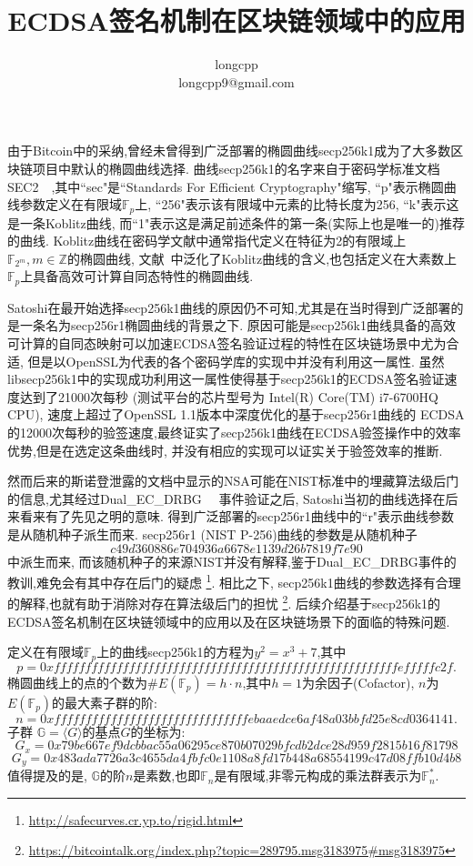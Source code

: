 \documentclass{article}
\renewcommand{\G}{\mathbb{G}}
\newcommand{\Z}{\mathbb{Z}}
\newcommand{\F}{\mathbb{F}}
\begin{document}
\title{ECDSA签名机制在区块链领域中的应用}
\author{longcpp \\ longcpp9@gmail.com}

\maketitle

由于Bitcoin中的采纳,曾经未曾得到广泛部署的椭圆曲线secp256k1成为了大多数区块链项目中默认的椭圆曲线选择.
曲线secp256k1的名字来自于密码学标准文档SEC2~\cite{}~,其中``sec"是``Standards For Efficient Cryptography"缩写,
``p"表示椭圆曲线参数定义在有限域$\F_p$上, ``256"表示该有限域中元素的比特长度为256, 
``k"表示这是一条Koblitz曲线, 而``1"表示这是满足前述条件的第一条(实际上也是唯一的)推荐的曲线.
Koblitz曲线在密码学文献中通常指代定义在特征为2的有限域上$\F_{2^m}, m\in\Z$的椭圆曲线,
文献~\cite{}中泛化了Koblitz曲线的含义,也包括定义在大素数上$\F_p$上具备高效可计算自同态特性的椭圆曲线.

Satoshi在最开始选择secp256k1曲线的原因仍不可知,尤其是在当时得到广泛部署的是一条名为secp256r1椭圆曲线的背景之下.
原因可能是secp256k1曲线具备的高效可计算的自同态映射可以加速ECDSA签名验证过程的特性在区块链场景中尤为合适,
但是以OpenSSL为代表的各个密码学库的实现中并没有利用这一属性.
虽然libsecp256k1中的实现成功利用这一属性使得基于secp256k1的ECDSA签名验证速度达到了21000次每秒
(测试平台的芯片型号为 Intel(R) Core(TM) i7-6700HQ CPU), 速度上超过了OpenSSL 1.1版本中深度优化的基于secp256r1曲线的
ECDSA的12000次每秒的验签速度,最终证实了secp256k1曲线在ECDSA验签操作中的效率优势,但是在选定这条曲线时,
并没有相应的实现可以证实关于验签效率的推断.

然而后来的斯诺登泄露的文档中显示的NSA可能在NIST标准中的埋藏算法级后门的信息,尤其经过Dual_EC_DRBG~\cite{}~
事件验证之后, Satoshi当初的曲线选择在后来看来有了先见之明的意味. 
得到广泛部署的secp256r1曲线中的``r"表示曲线参数是从随机种子派生而来. 
secp256r1 (NIST P-256)曲线的参数是从随机种子
$$c49d3608 86e70493 6a6678e1 139d26b7 819f7e90$$
中派生而来, 而该随机种子的来源NIST并没有解释,鉴于Dual_EC_DRBG事件的教训,难免会有其中存在后门的疑虑
\footnote{\url{http://safecurves.cr.yp.to/rigid.html}}.
相比之下, secp256k1曲线的参数选择有合理的解释,也就有助于消除对存在算法级后门的担忧
\footnote{\url{https://bitcointalk.org/index.php?topic=289795.msg3183975\#msg3183975}}.
后续介绍基于secp256k1的ECDSA签名机制在区块链领域中的应用以及在区块链场景下的面临的特殊问题.

定义在有限域$\F_p$上的曲线secp256k1的方程为$y^2 = x^3 + 7$,其中
\footnotesize
$$p = 0xfffffffffffffffffffffffffffffffffffffffffffffffffffffffefffffc2f.$$
\normalsize
椭圆曲线上的点的个数为$\#E(\F_p) = h \cdot n$,其中$h = 1$为余因子(Cofactor), $n$为$E(\F_p)$的最大素子群的阶:
\footnotesize
$$ n = 0xfffffffffffffffffffffffffffffffebaaedce6af48a03bbfd25e8cd0364141.$$
\normalsize
子群 $\G = \langle G \rangle$的基点$G$的坐标为:
\footnotesize
$$G_x = 0x79be667ef9dcbbac55a06295ce870b07029bfcdb2dce28d959f2815b16f81798$$
$$G_y = 0x483ada7726a3c4655da4fbfc0e1108a8fd17b448a68554199c47d08ffb10d4b8$$
\normalsize
值得提及的是, $\G$的阶$n$是素数,也即$\F_n$是有限域,非零元构成的乘法群表示为$\F_n^*$.
\end{document}
